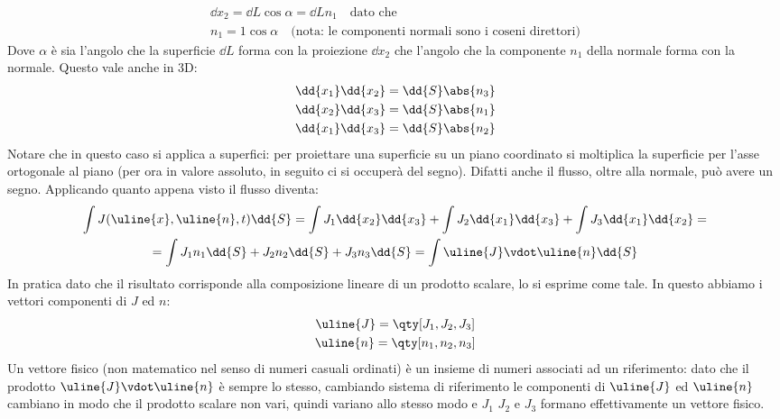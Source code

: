 %
	\begin{equation*}
		\begin{gathered}
			\dd{x_2} = \dd{L} \cos{\alpha} = \dd{L} n_1 \quad \text{dato che} \\
			n_1 = 1 \cos{\alpha} \quad \text{(nota: le componenti normali sono i coseni direttori)}
		\end{gathered}
	\end{equation*}
Dove $\alpha$ è sia l'angolo che la superficie $\dd{L}$ forma con la proiezione $\dd{x}_2$ che l'angolo che la componente $n_1$  della normale forma con la normale.
%
Questo vale anche in 3D:
%
	\begin{equation*}
		\begin{aligned}
			\dd{x_1} \dd{x_2} = \dd{S} \abs{n_3} \\
			\dd{x_2} \dd{x_3} = \dd{S} \abs{n_1} \\
			\dd{x_1} \dd{x_3} = \dd{S} \abs{n_2}
		\end{aligned}	
	\end{equation*}
%
Notare che in questo caso si applica a superfici: per proiettare una superficie su un piano coordinato si moltiplica la superficie per l'asse ortogonale al piano (per ora in valore assoluto, in seguito ci si occuperà del segno). Difatti anche il flusso, oltre alla normale, può avere un segno.
Applicando quanto appena visto il flusso diventa:
%
	\begin{equation*}
		\begin{gathered}
			\int J (\uline{x}, \uline{n}, t) \dd{S} = \int { J_1 \dd{x_2} \dd{x_3}} + \int {J_2 \dd{x_1} \dd{x_3}} + \int {J_3 \dd{x_1} \dd{x_2}} = \\
			=  \int{J_1 n_1 \dd{S}  +  J_2 n_2 \dd{S}  + J_3 n_3 \dd{S}} = \int{\uline{J} \vdot \uline{n} \dd{S}} \\
		\end{gathered}
	\end{equation*}
%
In pratica dato che il risultato corrisponde alla composizione lineare di un prodotto scalare, lo si esprime come tale. In questo abbiamo i vettori componenti di $J$ ed $n$:
%
	\begin{equation*}
		\begin{gathered}
			\uline{J} = \qty[J_1, J_2, J_3] \\
			\uline{n} = \qty[n_1, n_2, n_3]
		\end{gathered}
	\end{equation*}
%
Un vettore fisico (non matematico nel senso di numeri casuali ordinati) è un insieme di numeri associati ad un riferimento: dato che il prodotto $\uline{J} \vdot \uline{n}$ è sempre lo stesso, cambiando sistema di riferimento le componenti di $\uline{J}$ ed $\uline{n}$ cambiano in modo che il prodotto scalare non vari, quindi variano allo stesso modo e $J_1$ $J_2$ e $J_3$ formano effettivamente un vettore fisico.


